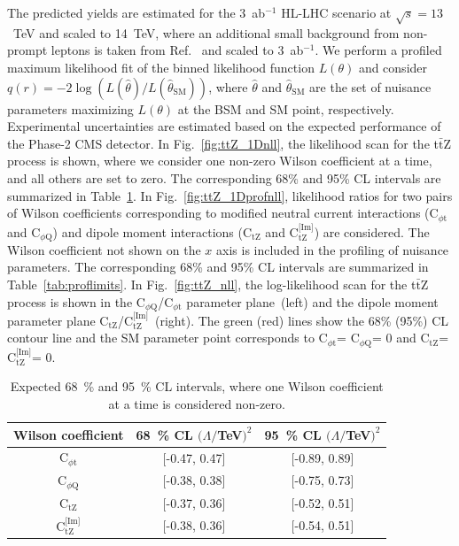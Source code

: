 \documentclass[letterpaper,11pt]{article}
\def\ttZ{t$\bar{\text{t}}$Z\xspace}
\def\ctZ{C$_\text{tZ}$\xspace}
\def\ctZI{C$_\text{tZ}^\text{[Im]}$\xspace}
\def\cpt{C$_{\phi \text{t}}$\xspace}
\def\cpQM{C$_{\phi \text{Q}}$\xspace}
\def\TeV{TeV\xspace}
\begin{document}
The predicted yields are estimated for the 3~ab${}^{-1}$ HL-LHC scenario at $\sqrt{s}=13$~\TeV and scaled to 14~\TeV, where an additional small background from non-prompt leptons is taken from Ref.~\cite{Sirunyan:2017uzs} and scaled to 3~ab${}^{-1}$.
We perform a profiled maximum likelihood fit of the binned likelihood function $L(\theta)$ and consider $q(r)=-2\log(L(\hat{\theta})/L(\hat{\theta}_{\textrm{SM}}))$, where $\hat{\theta}$ and
$\hat{\theta}_\textrm{SM}$ are the set of nuisance parameters maximizing $L(\theta)$ at the BSM and SM point, respectively.
Experimental uncertainties are estimated based on the expected performance of the Phase-2 CMS detector.
In Fig.~\ref{fig:ttZ_1Dnll}, the likelihood scan for the \ttZ process is shown, where we consider one non-zero Wilson coefficient at a time, and all others are set to zero.
The corresponding 68\% and 95\% CL intervals are summarized in Table~\ref{tab:limits}.
In Fig.~\ref{fig:ttZ_1Dprofnll}, likelihood ratios for two pairs of Wilson coefficients corresponding to modified neutral current interactions (\cpt and \cpQM) and dipole moment interactions (\ctZ and \ctZI) are considered.
The Wilson coefficient not shown on the $x$ axis is included in the profiling of nuisance parameters.
The corresponding 68\% and 95\% CL intervals are summarized in Table~\ref{tab:proflimits}.
In Fig.~\ref{fig:ttZ_nll}, the log-likelihood scan for the \ttZ process is shown in the \cpQM/\cpt parameter plane~(left) and the dipole moment parameter plane \ctZ/\ctZI~(right).
The green (red) lines show the 68\% (95\%) CL contour line and the SM parameter point corresponds to \cpt = \cpQM = 0 and \ctZ = \ctZI = 0.


\begin{table}[h]
\caption{Expected 68~\% and 95~\% CL intervals, where one Wilson coefficient at a time is considered non-zero.}\label{tab:limits}
\begin{center}
\begin{tabular}{c|c|c}
\hline
Wilson coefficient & 68~\% CL $(\Lambda/$TeV$)^2$ & 95~\% CL $(\Lambda/$TeV$)^2$ \\
\hline
\hline
\cpt   & [-0.47, 0.47]                 & [-0.89, 0.89]                 \\
\hline
\cpQM  & [-0.38, 0.38]                 & [-0.75, 0.73]                 \\
\hline
\ctZ   & [-0.37, 0.36]                 & [-0.52, 0.51]                 \\
\hline
\ctZI  & [-0.38, 0.36]                 & [-0.54, 0.51]                 \\
\hline
\end{tabular}
\end{center}
\end{table}
\end{document}
